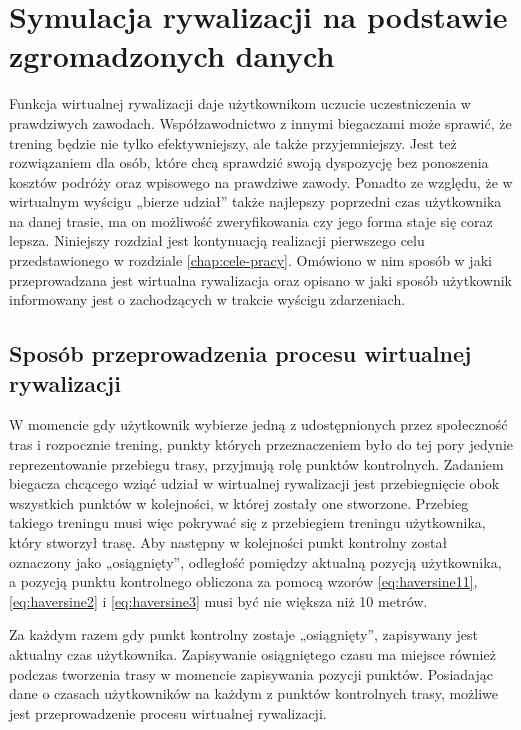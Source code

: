 \chapter{Symulacja rywalizacji na podstawie zgromadzonych danych}\label{chap:symulacja-rywalizacji}
Funkcja wirtualnej rywalizacji daje użytkownikom uczucie uczestniczenia w prawdziwych zawodach. Współzawodnictwo z innymi biegaczami może sprawić, że trening będzie nie tylko efektywniejszy, ale także przyjemniejszy. Jest też rozwiązaniem dla osób, które chcą sprawdzić swoją dyspozycję bez ponoszenia kosztów podróży oraz wpisowego na prawdziwe zawody. Ponadto ze względu, że w wirtualnym wyścigu „bierze udział” także najlepszy poprzedni czas użytkownika na danej trasie, ma on możliwość zweryfikowania czy jego forma staje się coraz lepsza. Niniejszy rozdział jest kontynuacją realizacji pierwszego celu przedstawionego w rozdziale \ref{chap:cele-pracy}. Omówiono w nim sposób w jaki przeprowadzana jest wirtualna rywalizacja oraz opisano w jaki sposób użytkownik informowany jest o zachodzących w trakcie wyścigu zdarzeniach.
\section{Sposób przeprowadzenia procesu wirtualnej rywalizacji}\label{chapter:sposob-rywalizacji}
W momencie gdy użytkownik wybierze jedną z udostępnionych przez społeczność tras i rozpocznie trening, punkty których przeznaczeniem było do tej pory jedynie reprezentowanie przebiegu trasy, przyjmują rolę punktów kontrolnych. Zadaniem biegacza chcącego wziąć udział w wirtualnej rywalizacji jest przebiegnięcie obok wszystkich punktów w kolejności, w której zostały one stworzone. Przebieg takiego treningu musi więc pokrywać się z przebiegiem treningu użytkownika, który stworzył trasę. Aby następny w kolejności punkt kontrolny został oznaczony jako „osiągnięty”, odległość pomiędzy aktualną pozycją użytkownika, a pozycją punktu kontrolnego obliczona za pomocą wzorów \ref{eq:haversine11},  \ref{eq:haversine2} i \ref{eq:haversine3} musi być nie większa niż 10 metrów.

Za każdym razem gdy punkt kontrolny zostaje „osiągnięty”, zapisywany jest aktualny czas użytkownika. Zapisywanie osiągniętego czasu ma miejsce również podczas tworzenia trasy w momencie zapisywania pozycji punktów. Posiadając dane o czasach użytkowników na każdym z punktów kontrolnych trasy, możliwe jest przeprowadzenie procesu wirtualnej rywalizacji.


